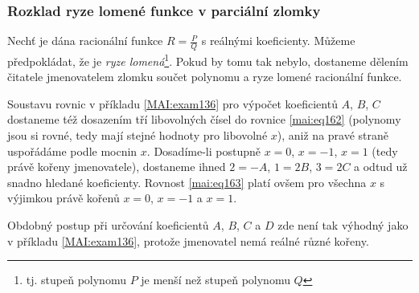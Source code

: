       
      
    \subsubsection{Rozklad ryze lomené funkce v parciální zlomky}
    Nechť je dána racionální funkce $R = \frac{P}{Q}$ s reálnými koeficienty. Můžeme
    předpokládat, že je \emph{ryze lomená}\footnote{tj. stupeň polynomu $P$ je menší než
    stupeň polynomu $Q$}. Pokud by tomu tak nebylo, dostaneme dělením čitatele jmenovatelem
    zlomku součet polynomu a ryze lomené racionální funkce.

    

    Soustavu rovnic v příkladu \ref{MAI:exam136} pro výpočet koeficientů \(A\), \(B\), \(C\)
    dostaneme též dosazením tří libovolných čísel do rovnice \ref{mai:eq162} (polynomy jsou si
    rovné, tedy mají stejné hodnoty pro libovolné \(x\)), aniž na pravé straně uspořádáme podle
    mocnin \(x\). Dosadíme-li postupně \(x=0\), \(x=-1\), \(x=1\) (tedy právě kořeny jmenovatele),
    dostaneme ihned \(2=-A\), \(1=2B\), \(3=2C\) a odtud už snadno hledané koeficienty. Rovnost
    \ref{mai:eq163} platí ovšem pro všechna \(x\) s výjimkou právě kořenů  \(x=0\), \(x=-1\) a
    \(x=1\).

    

    Obdobný postup při určování koeficientů \(A\), \(B\), \(C\) a \(D\) zde není tak výhodný jako
    v příkladu \ref{MAI:exam136}, protože jmenovatel nemá reálné různé kořeny. 

    

    
    
    
      

